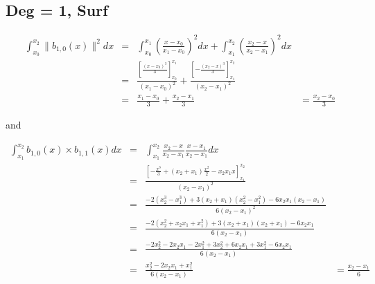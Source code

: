 \documentclass[paper=a4, fontsize=11pt]{scrartcl}
\numberwithin{equation}{section}		%
\numberwithin{figure}{section}			%
\numberwithin{table}{section}				%
\begin{document}
\begin{landscape}
\subsection{Deg = 1, Surf}
$$
\begin{array}{llll}
\int_{x_0}^{x_2} \|b_{1,0}(x)\|^2 dx & = & \int_{x_0}^{x_1} \left(\frac{x-x_0}{x_1-x_0}\right)^2  dx + \int_{x_1}^{x_2} \left(\frac{x_2-x}{x_2-x_1}\right)^2  dx\\
& = & \frac{\left[ \frac{(x-x_0)^3}{3} \right]_{x_0}^{x_1} }{(x_1-x_0)^2} + \frac{\left[ -\frac{(x_2-x)^3}{3} \right]_{x_1}^{x_2} }{(x_2-x_1)^2}\\
& = & \frac{x_1-x_0}{3} + \frac{x_2-x_1}{3}
& = \frac{x_2-x_0}{3}
\end{array}
$$

and

$$
\begin{array}{llll}
\int_{x_1}^{x_2} b_{1,0}(x)\times b_{1,1}(x) dx & = & \int_{x_1}^{x_2} \frac{x_2-x}{x_2-x_1}\frac{x-x_1}{x_2-x_1}  dx\\
& = & \frac{\left[ -\frac{x^3}{3} + (x_2+x_1)\frac{x^2}{2} - x_2x_1x \right]_{x_1}^{x_2}}{(x_2-x_1)^2}\\
& = & \frac{ -2(x_2^3-x_1^3) + 3(x_2+x_1)(x_2^2-x_1^2) - 6x_2x_1(x_2-x_1) }{6(x_2-x_1)^2}\\
& = & \frac{ -2(x_2^2+x_2x_1+x_1^2) + 3(x_2+x_1)(x_2+x_1) - 6x_2x_1 }{6(x_2-x_1)}\\
& = & \frac{ -2x_2^2 - 2x_2x_1 - 2x_1^2 + 3x_2^2 + 6x_2x_1 + 3x_1^2 - 6x_2x_1 }{6(x_2-x_1)}\\
& = & \frac{ x_2^2 - 2x_2x_1 + x_1^2 }{6(x_2-x_1)}
& = \frac{x_2 - x_1}{6}
\end{array}
$$


\end{landscape}
\end{document}
